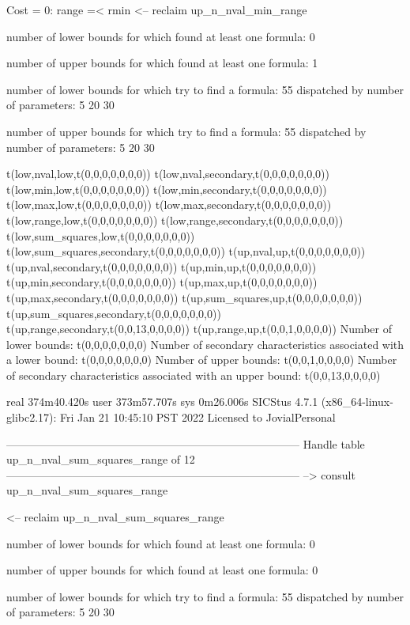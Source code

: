 Cost =  0:  range =< rmin
<-- reclaim up_n_nval_min_range

number of lower bounds for which found at least one formula: 0

number of upper bounds for which found at least one formula: 1

number of lower bounds for which try to find a formula: 55
dispatched by number of parameters: 5  20  30

number of upper bounds for which try to find a formula: 55
dispatched by number of parameters: 5  20  30

t(low,nval,low,t(0,0,0,0,0,0,0))
t(low,nval,secondary,t(0,0,0,0,0,0,0))
t(low,min,low,t(0,0,0,0,0,0,0))
t(low,min,secondary,t(0,0,0,0,0,0,0))
t(low,max,low,t(0,0,0,0,0,0,0))
t(low,max,secondary,t(0,0,0,0,0,0,0))
t(low,range,low,t(0,0,0,0,0,0,0))
t(low,range,secondary,t(0,0,0,0,0,0,0))
t(low,sum_squares,low,t(0,0,0,0,0,0,0))
t(low,sum_squares,secondary,t(0,0,0,0,0,0,0))
t(up,nval,up,t(0,0,0,0,0,0,0))
t(up,nval,secondary,t(0,0,0,0,0,0,0))
t(up,min,up,t(0,0,0,0,0,0,0))
t(up,min,secondary,t(0,0,0,0,0,0,0))
t(up,max,up,t(0,0,0,0,0,0,0))
t(up,max,secondary,t(0,0,0,0,0,0,0))
t(up,sum_squares,up,t(0,0,0,0,0,0,0))
t(up,sum_squares,secondary,t(0,0,0,0,0,0,0))
t(up,range,secondary,t(0,0,13,0,0,0,0))
t(up,range,up,t(0,0,1,0,0,0,0))
Number of lower bounds:                                             t(0,0,0,0,0,0,0)
Number of secondary characteristics associated with a lower bound:  t(0,0,0,0,0,0,0)
Number of upper bounds:                                             t(0,0,1,0,0,0,0)
Number of secondary characteristics associated with an upper bound: t(0,0,13,0,0,0,0)

real	374m40.420s
user	373m57.707s
sys	0m26.006s
SICStus 4.7.1 (x86_64-linux-glibc2.17): Fri Jan 21 10:45:10 PST 2022
Licensed to JovialPersonal


--------------------------------------------------------------------------------
Handle table up_n_nval_sum_squares_range of 12
--------------------------------------------------------------------------------
--> consult up_n_nval_sum_squares_range

<-- reclaim up_n_nval_sum_squares_range

number of lower bounds for which found at least one formula: 0

number of upper bounds for which found at least one formula: 0

number of lower bounds for which try to find a formula: 55
dispatched by number of parameters: 5  20  30

